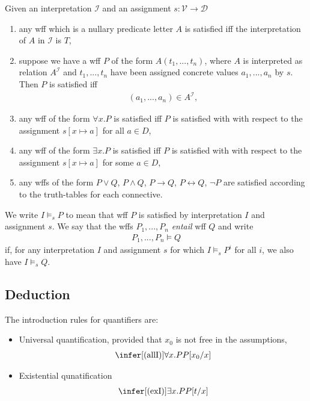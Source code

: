 \documentclass{article}
\begin{document}
\begin{definition}[Satisfaction]
    Given an interpretation $\mathcal{I}$ and an assignment $s:\mathcal{V}\to\mathcal{D}$
    \begin{enumerate}
        \item any wff which is a nullary predicate letter $A$ is satisfied iff the
            interpretation of $A$ in $\mathcal{I}$ is $T$,
        \item suppose we have a wff $P$ of the form $A(t_1,..., t_n)$, where $A$ is
            interpreted as relation $A^\mathcal{I}$ and $t_1,...,t_n$ have been assigned
            concrete values $a_1,...,a_n$ by $s$. Then $P$ is satisfied iff \begin{align*}
                (a_1,...,a_n)\in A^\mathcal{I},
            \end{align*}
        \item any wff of the form $\forall x.P$ is satisfied iff $P$ is satisfied with
            with respect to the assignment $s[x\mapsto a]$ for all $a\in D$,
        \item any wff of the form $\exists x.P$ is satisfied iff $P$ is satisfied with
            with respect to the assignment $s[x\mapsto a]$ for some $a\in D$,
        \item any wffs of the form $P\vee Q$, $P\wedge Q$, $P\rightarrow Q$, $P\leftrightarrow Q$,
            $\neg P$ are satisfied according to the truth-tables for each connective.
    \end{enumerate} 
\end{definition}

\begin{definition}[Entailment]
    We write $I\vDash_s P$ to mean that wff $P$ is satisfied by interpretation $I$ and
    assignment $s$.  We say that the wffs $P_1,...,P_n$ \emph{entail} wff $Q$ and write
    \begin{align*}
        P_1,...,P_n\vDash Q
    \end{align*}
    if, for any interpretation $I$ and assignment $s$ for which $I\vDash_s P^i$ for all $i$,
    we also have $I\vDash_s Q$.
\end{definition}

\subsection{Deduction}

\begin{definition}
    The introduction rules for quantifiers are:
    \begin{itemize}
        \item Universal quantification, provided that $x_0$ is not free in the assumptions, \begin{align*}
            \infer[(\text{allI})]{\forall x. P}{P[x_0/x]}
        \end{align*}
        \item Existential qunatification \begin{align*}
            \infer[(\text{exI})]{\exists x.P}{P[t/x]}
        \end{align*}
    \end{itemize}
\end{definition}
\end{document}
